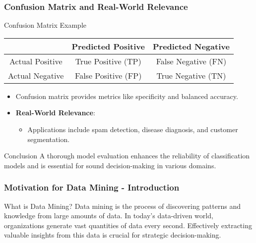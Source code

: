 \documentclass[aspectratio=169]{beamer}
\begin{document}
\begin{frame}[fragile]
    \frametitle{Confusion Matrix and Real-World Relevance}

    \begin{block}{Confusion Matrix Example}
        \begin{tabular}{|c|c|c|}
            \hline
            & Predicted Positive & Predicted Negative \\
            \hline
            Actual Positive & True Positive (TP) & False Negative (FN) \\
            \hline
            Actual Negative & False Positive (FP) & True Negative (TN) \\
            \hline
        \end{tabular}
    \end{block}

    \begin{itemize}
        \item Confusion matrix provides metrics like specificity and balanced accuracy.
        \item \textbf{Real-World Relevance}:
        \begin{itemize}
            \item Applications include spam detection, disease diagnosis, and customer segmentation.
        \end{itemize}
    \end{itemize}
    
    \begin{block}{Conclusion}
        A thorough model evaluation enhances the reliability of classification models and is essential for sound decision-making in various domains.
    \end{block}
\end{frame}

\begin{frame}[fragile]
    \frametitle{Motivation for Data Mining - Introduction}
    \begin{block}{What is Data Mining?}
        Data mining is the process of discovering patterns and knowledge from large amounts of data. In today's data-driven world, organizations generate vast quantities of data every second. Effectively extracting valuable insights from this data is crucial for strategic decision-making.
    \end{block}
\end{frame}
\end{document}
